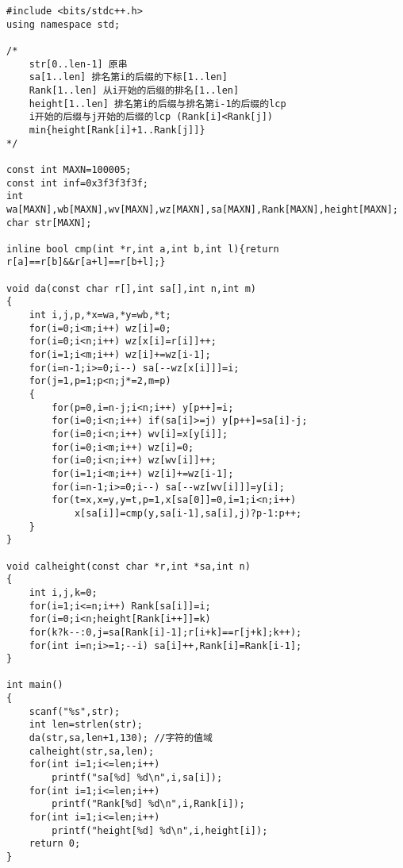 \begin{lstlisting}
#include <bits/stdc++.h>
using namespace std;

/*
    str[0..len-1] 原串
    sa[1..len] 排名第i的后缀的下标[1..len]
    Rank[1..len] 从i开始的后缀的排名[1..len]
    height[1..len] 排名第i的后缀与排名第i-1的后缀的lcp
    i开始的后缀与j开始的后缀的lcp (Rank[i]<Rank[j])
    min{height[Rank[i]+1..Rank[j]]}
*/

const int MAXN=100005;
const int inf=0x3f3f3f3f;
int wa[MAXN],wb[MAXN],wv[MAXN],wz[MAXN],sa[MAXN],Rank[MAXN],height[MAXN];
char str[MAXN];

inline bool cmp(int *r,int a,int b,int l){return r[a]==r[b]&&r[a+l]==r[b+l];}

void da(const char r[],int sa[],int n,int m)
{
    int i,j,p,*x=wa,*y=wb,*t;
    for(i=0;i<m;i++) wz[i]=0;
    for(i=0;i<n;i++) wz[x[i]=r[i]]++;
    for(i=1;i<m;i++) wz[i]+=wz[i-1];
    for(i=n-1;i>=0;i--) sa[--wz[x[i]]]=i;
    for(j=1,p=1;p<n;j*=2,m=p)
    {
        for(p=0,i=n-j;i<n;i++) y[p++]=i;
        for(i=0;i<n;i++) if(sa[i]>=j) y[p++]=sa[i]-j;
        for(i=0;i<n;i++) wv[i]=x[y[i]];
        for(i=0;i<m;i++) wz[i]=0;
        for(i=0;i<n;i++) wz[wv[i]]++;
        for(i=1;i<m;i++) wz[i]+=wz[i-1];
        for(i=n-1;i>=0;i--) sa[--wz[wv[i]]]=y[i];
        for(t=x,x=y,y=t,p=1,x[sa[0]]=0,i=1;i<n;i++)
            x[sa[i]]=cmp(y,sa[i-1],sa[i],j)?p-1:p++;
    }
}

void calheight(const char *r,int *sa,int n)
{
    int i,j,k=0;
    for(i=1;i<=n;i++) Rank[sa[i]]=i;
    for(i=0;i<n;height[Rank[i++]]=k)
    for(k?k--:0,j=sa[Rank[i]-1];r[i+k]==r[j+k];k++);
    for(int i=n;i>=1;--i) sa[i]++,Rank[i]=Rank[i-1];
}

int main()
{
    scanf("%s",str);
    int len=strlen(str);
    da(str,sa,len+1,130); //字符的值域
    calheight(str,sa,len);
    for(int i=1;i<=len;i++)
        printf("sa[%d] %d\n",i,sa[i]);
    for(int i=1;i<=len;i++)
        printf("Rank[%d] %d\n",i,Rank[i]);
    for(int i=1;i<=len;i++)
        printf("height[%d] %d\n",i,height[i]);
    return 0;
}
\end{lstlisting}